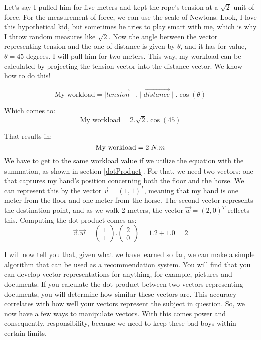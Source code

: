 \documentclass[a4,12pt,twosided,openany]{memoir}
\begin{document}
Let's say I pulled him for five meters and kept the rope's tension at a $\sqrt{2}$ unit of force. For the measurement of force, we can use the scale of Newtons. Look, I love this hypothetical kid, but sometimes he tries to play smart with me, which is why I throw random measures like $\sqrt{2}$. Now the angle between the vector representing tension and the one of distance is given by $\theta$, and it has for value, $\theta = 45$ degrees. I will pull him for two meters. This way, my workload can be calculated by projecting the tension vector into the distance vector. We know how to do this!

\[\textrm{My workload} = \mid \overrightarrow{tension}\mid.\mid \overrightarrow{distance}\mid.\cos(\theta)\]
\par 
\indent
Which comes to:
\[\textrm{My workload} = 2.\sqrt{2}.\cos(45)\]
\par 
\indent
That results in:
\[\textrm{My workload} = 2 \hspace{1mm} N.m\]
We have to get to the same workload value if we utilize the equation with the summation, as shown in section \ref{dotProduct}. For that, we need two vectors: one that captures my hand's position concerning both the floor and the horse. We can represent this by the vector $\overrightarrow{v} = (1,1)^T$, meaning that my hand is one meter from the floor and one meter from the horse. The second vector represents the destination point, and as we walk 2 meters, the vector $\overrightarrow{w} = (2,0)^T$ reflects this. Computing the dot product comes as:
\[\overrightarrow{v}.\overrightarrow{w} = \begin{pmatrix}
1\\
1
\end{pmatrix}.\begin{pmatrix}
2\\
0
\end{pmatrix} = 1.2 + 1.0 = 2\]

I will now tell you that, given what we have learned so far, we can make a simple algorithm that can be used as a recommendation system. You will find that you can develop vector representations for anything, for example, pictures and documents. If you calculate the dot product between two vectors representing documents, you will determine how similar these vectors are. This accuracy correlates with how well your vectors represent the subject in question. So, we now have a few ways to manipulate vectors. With this comes power and consequently, responsibility, because we need to keep these bad boys within certain limits.
\end{document}

